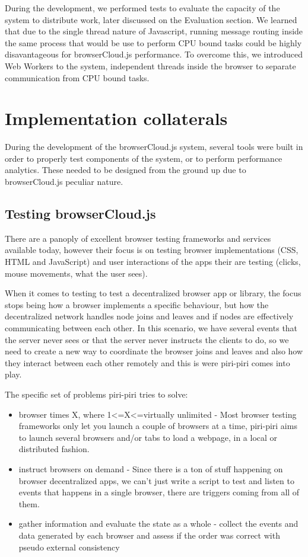 During the development, we performed tests to evaluate the capacity of the system to distribute work, later discussed on the Evaluation section. We learned that due to the single thread nature of Javascript, running message routing inside the same process that would be use to perform CPU bound tasks could be highly disavantageous for browserCloud.js performance. To overcome this, we introduced Web Workers to the system, independent threads inside the browser to separate communication from CPU bound tasks.

\section{Implementation collaterals}

During the development of the browserCloud.js system, several tools were built in order to properly test components of the system, or to perform performance analytics. These needed to be designed from the ground up due to browserCloud.js peculiar nature.

\subsection{Testing browserCloud.js}

There are a panoply of excellent browser testing frameworks and services available today, however their focus is on testing browser implementations (CSS, HTML and JavaScript) and user interactions of the apps their are testing (clicks, mouse movements, what the user sees).

When it comes to testing to test a decentralized browser app or library, the focus stops being how a browser implements a specific behaviour, but how the decentralized network handles node joins and leaves and if nodes are effectively communicating between each other. In this scenario, we have several events that the server never sees or that the server never instructs the clients to do, so we need to create a new way to coordinate the browser joins and leaves and also how they interact between each other remotely and this is were piri-piri comes into play.

The specific set of problems piri-piri tries to solve:

\begin{itemize}
    \item browser times X, where 1<=X<=virtually unlimited - Most browser testing frameworks only let you launch a couple of browsers at a time, piri-piri aims to launch several browsers and/or tabs to load a webpage, in a local or distributed fashion.

    \item instruct browsers on demand - Since there is a ton of stuff happening on browser decentralized apps, we can't just write a script to test and listen to events that happens in a single browser, there are triggers coming from all of them.

    \item gather information and evaluate the state as a whole - collect the events and data generated by each browser and assess if the order was correct with pseudo external consistency
\end{itemize}

